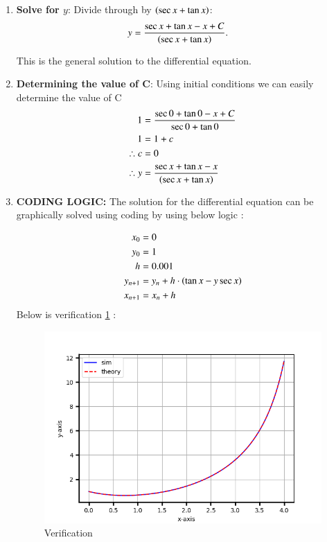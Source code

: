 \documentclass[journal]{IEEEtran}
\begin{document}
\begin{enumerate}
  \item \textbf{Solve for $y$}:
  Divide through by $\left(\sec x + \tan x\right)$:
  \begin{align}                                                                      
  	    y &= \frac{\sec x + \tan x - x + C}{\left(\sec x + \tan x\right)}.
  \end{align} 

  This is the general solution to the differential equation.
 \item \textbf{Determining the value of C}:
    Using initial conditions we can easily determine the value of C
    \begin{align}    
	    1 &= \frac{\sec {0} + \tan {0} -x +C}{\sec{0}+\tan{0}} \\
	    1 &= 1+c \\
	    \therefore c &= 0 \\
	    \therefore y &= \frac{\sec x + \tan x - x}{\left(\sec x + \tan x\right)}
    \end{align}
    \item \textbf{CODING LOGIC:} The solution for the differential equation can be graphically solved using coding by using below logic :

\begin{align} 
	x_0 &= 0 \\ 
	y_0 &= 1  \\
	h&=0.001 \\
	y_{n+1} &= y_{n} + h\cdot\left(\tan{x}-y\sec{x}\right) \\ 
	x_{n+1} &= x_{n} + h 
\end{align}
\newpage
Below is verification \ref{fig:example} :
\begin{figure}[h]  %
    \centering  %
    \includegraphics[width=\columnwidth]{fig/Figure_1.png}  
    \caption{Verification}
    \label{fig:example}  %
\end{figure}
\end{enumerate}
               
\end{document}

